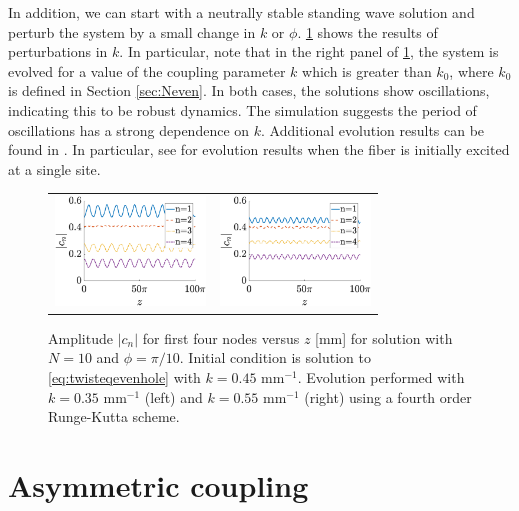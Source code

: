 \documentclass[reprint, amsmath,amssymb,aps,pra]{revtex4-2}
\begin{document}
In addition, we can start with a neutrally stable standing wave solution and perturb the system by a small change in $k$ or $\phi$. \cref{fig:evenholekperturbed} shows the results of perturbations in $k$. In particular, note that in the right panel of \cref{fig:evenholekperturbed}, the system is evolved for a value of the coupling parameter $k$ which is greater than $k_0$, where $k_0$ is defined in Section \ref{sec:Neven}. In both cases, the solutions show oscillations, indicating this to be robust dynamics. The simulation suggests the period of oscillations has a strong dependence on $k$. Additional evolution results can be found in \cite{castro2016}. In particular, see \cite[Figure 4]{castro2016} for evolution results when the fiber is initially excited at a single site. 

\begin{figure}
\begin{center}
\begin{tabular}{cc}
\includegraphics[width=4cm]{even10pertk45to35} & 
\includegraphics[width=4cm]{even10pertk45to55}
\end{tabular}
\end{center}
\caption{Amplitude $|c_n|$ for first four nodes versus $z$ [mm] for solution with $N=10$ and $\phi = \pi/10$. Initial condition is solution to \cref{eq:twisteqevenhole} with $k = 0.45\text{ mm}^{-1}$. Evolution performed with $k = 0.35\text{ mm}^{-1}$ (left) and $k = 0.55\text{ mm}^{-1}$ (right) using a fourth order Runge-Kutta scheme.}
\label{fig:evenholekperturbed}
\end{figure}

\section{Asymmetric coupling}\label{sec:variants}
\end{document}
